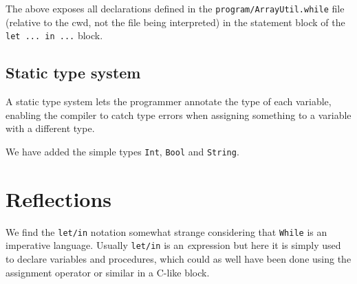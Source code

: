 \documentclass{article}
\begin{document}
The above exposes all declarations defined in the {\tt program/ArrayUtil.while} file (relative to the cwd, not the file being interpreted) in the statement block of the {\tt let ... in ...} block.

\subsection{Static type system}
\label{sec:type}
A static type system lets the programmer annotate the type of each
variable, enabling the compiler to catch type errors when assigning
something to a variable with a different type.

We have added the simple types {\tt Int}, {\tt Bool} and {\tt String}.


\section{Reflections}
We find the {\tt let/in} notation somewhat strange considering that {\tt While} is an imperative language. Usually {\tt let/in} is an {\textit expression} but here it is simply used to declare variables and procedures, which could as well have been done using the assignment operator or similar in a C-like block.
\end{document}
